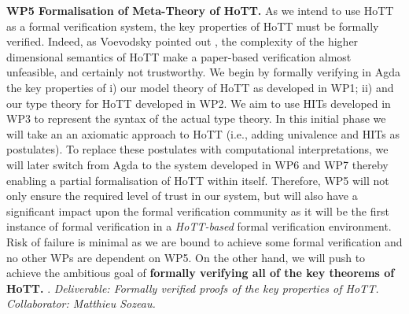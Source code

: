 \documentclass[a4paper,11pt]{article}
\newcommand{\eg}{{e.g.}\ }
\begin{document}
{\bf WP5 Formalisation of Meta-Theory of HoTT.}  As we intend to use
HoTT as a formal verification system, the key properties of HoTT must
be formally verified. Indeed, as Voevodsky pointed out
\cite{voevodsky-ias14}, the complexity of the higher dimensional
semantics of HoTT make a paper-based verification almost unfeasible,
and certainly not trustworthy. We begin by formally verifying in Agda
the key properties of i) our model theory of HoTT as developed in WP1;
ii) and our type theory for HoTT developed in WP2. We aim to use HITs
developed in WP3 to represent the syntax of the actual type theory.
In this initial phase we will take an an axiomatic approach to HoTT
(i.e., adding univalence and HITs as postulates). To replace these
postulates with computational interpretations, we will later switch
from Agda to the system developed in WP6 and WP7 thereby enabling a
partial formalisation of HoTT within itself.
Therefore, WP5 will not only ensure the required level of trust in our
system, but will also have a significant impact upon the formal
verification community as it will be the first instance of formal
verification in a {\em HoTT-based} formal verification
environment. Risk of failure is minimal as we are bound to achieve
some formal verification and no other WPs are dependent on WP5. On the
other hand, we will push to achieve the ambitious goal of {\bf formally
verifying all of the key theorems of HoTT.} 
. {\em Deliverable: Formally verified proofs
  of the key properties of HoTT.  Collaborator: Matthieu Sozeau.  }
\end{document}
